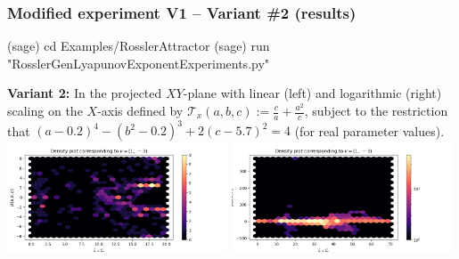 \documentclass[usenames,svgnames,dvipsnames,10pt]{beamer}
\begin{document}
\begin{frame}[fragile]
\frametitle{Modified experiment V1 -- Variant \#2 (results)}

\begin{center}
\begin{code}
(sage) cd Examples/RosslerAttractor
(sage) run "RosslerGenLyapunovExponentExperiments.py"
\end{code}
\textbf{Variant 2:} 
In the projected $XY$-plane with linear (left) and logarithmic (right) scaling on the $X$-axis defined by 
$\mathcal{T}_x(a, b, c) := \frac{c}{a} + \frac{a^2}{c}$, subject to the restriction that 
$(a-0.2)^4-(b^2-0.2)^3+2 (c-5.7)^2 = 4$ (for real parameter values). \\ 
\includegraphics[width=0.49\textwidth]{../Images/RosslerAttractorExpt1-Variant2-linearscale-TypeXY-2021-10-27-025531.png}
\includegraphics[width=0.49\textwidth]{../Images/RosslerAttractorExpt1-Variant2-logscale-TypeXY-2021-10-27-025057.png}
\end{center}

\end{frame}
\end{document}
